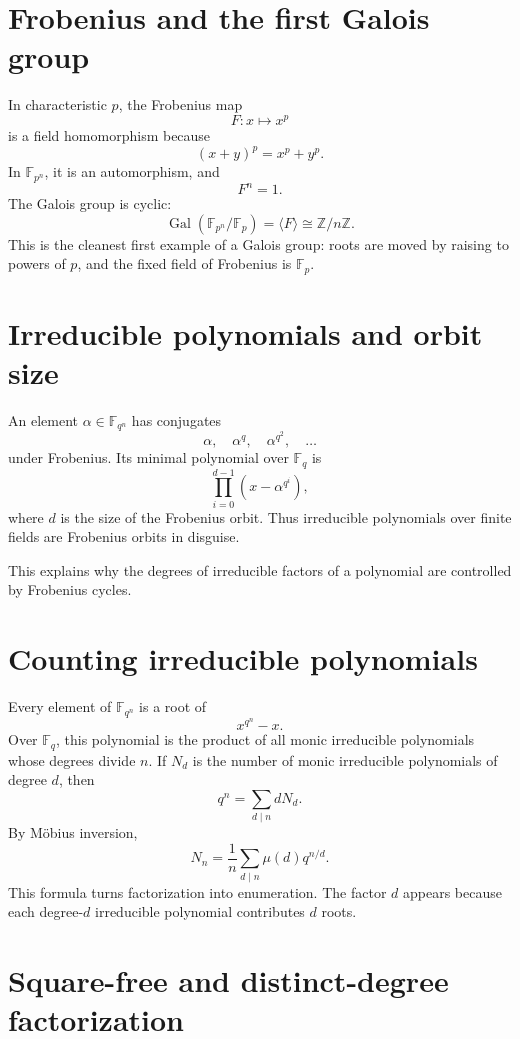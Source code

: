 \section{Frobenius and the first Galois group}

In characteristic \(p\), the Frobenius map
\[
  F:x\mapsto x^p
\]
is a field homomorphism because
\[
  (x+y)^p=x^p+y^p.
\]
In \(\mathbb F_{p^n}\), it is an automorphism, and
\[
  F^n=1.
\]
The Galois group is cyclic:
\[
  \operatorname{Gal}(\mathbb F_{p^n}/\mathbb F_p)
  =\langle F\rangle\cong \mathbb Z/n\mathbb Z.
\]
This is the cleanest first example of a Galois group: roots are moved by raising to powers of \(p\), and the fixed field of Frobenius is \(\mathbb F_p\).

\section{Irreducible polynomials and orbit size}

An element \(\alpha\in\mathbb F_{q^n}\) has conjugates
\[
  \alpha,\quad \alpha^q,\quad \alpha^{q^2},\quad\ldots
\]
under Frobenius.  Its minimal polynomial over \(\mathbb F_q\) is
\[
  \prod_{i=0}^{d-1}(x-\alpha^{q^i}),
\]
where \(d\) is the size of the Frobenius orbit.  Thus irreducible polynomials over finite fields are Frobenius orbits in disguise.

This explains why the degrees of irreducible factors of a polynomial are controlled by Frobenius cycles.

\section{Counting irreducible polynomials}

Every element of \(\mathbb F_{q^n}\) is a root of
\[
  x^{q^n}-x.
\]
Over \(\mathbb F_q\), this polynomial is the product of all monic irreducible polynomials whose degrees divide \(n\).  If \(N_d\) is the number of monic irreducible polynomials of degree \(d\), then
\[
  q^n=\sum_{d\mid n}dN_d.
\]
By Möbius inversion,
\[
  N_n=\frac1n\sum_{d\mid n}\mu(d)q^{n/d}.
\]
This formula turns factorization into enumeration.  The factor \(d\) appears because each degree-\(d\) irreducible polynomial contributes \(d\) roots.

\section{Square-free and distinct-degree factorization}

